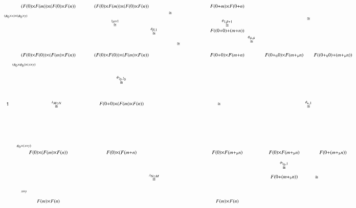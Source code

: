 \documentclass[reqno]{amsart}
\begin{document}
\[
\begin{tikzpicture}[scale=1.6]
\node () at (3,-2.5) {$\scriptstyle{\stackrel{\lambda_{M \odot N}}\cong}$};
\node () at (8,-2.5) {$\scriptstyle{\cong}$};
\node () at (5,-1.75) {$\scriptstyle{\stackrel{\phi_{!_0,!_0}}\cong}$};
\node () at (10.75,-2.5) {$\scriptstyle{\stackrel{\phi_{\kappa,1}}\cong}$};
\node () at (4.8,0) {$\scriptstyle{\stackrel{1 \mu \times 1}\cong}$};
\node () at (6.5,0.3) {$\scriptstyle{\cong}$};
\node () at (6,-0.25) {$\scriptstyle{\stackrel{\phi_{\beta,1}}\cong}$};
\node () at (8.25,0) {$\scriptstyle{\stackrel{\phi_{1,\beta+1}}\cong}$};
\node () at (6.75,-.65) {$\scriptstyle{\cong}$};
\node () at (9,-0.5) {$\scriptstyle{\stackrel{\phi_{\psi,\psi}}\cong}$};
\node () at (10.75,0.125) {$\scriptstyle{\cong}$};
\node (A) at (2.75,-1) {$\scriptstyle{(F(0) \times F(0)) \times (F(m) \times F(n))}$};
\node (A') at (5,-1) {$\scriptstyle{(F(0) \times F(0)) \times (F(m) \times F(n))}$};
\node (A'') at (8.25,-1) {$\scriptstyle{F(0+0) \times F(m+n)}$};
\node (A''') at (10,-1) {$\scriptstyle{F(0+_0 0) \times F(m+_b n)}$};
\node (A'''') at (11.5,-1) {$\scriptstyle{F((0+_0 0)+(m+_b n))}$};
\node (J) at (5,-2.5) {$\scriptstyle{F(0+0) \times (F(m) \times F(n))}$};
\node (J') at (6,-4.75) {$\scriptstyle{\stackrel{\lambda_{N \odot M}}\cong}$};
\node (J''') at (10,-4.375) {$\scriptstyle{\stackrel{\phi_{!_0,1}} \cong}$};
\node (J'''') at (11,-4.75) {$\scriptstyle{\cong}$};
\node (K) at (2.75,-4) {$\scriptstyle{F(0) \times (F(m) \times F(n))}$};
\node (K') at (5,-4) {$\scriptstyle{F(0) \times (F(m+n)}$};
\node (Y) at (10,-4.75) {$\scriptstyle{F(0+(m+_b n))}$};
\node (K'') at (8.25,-4) {$\scriptstyle{F(0) \times F(m+_b n)}$};
\node (K''') at (10,-4) {$\scriptstyle{F(0) \times F(m+_b n)}$};
\node (K'''') at (11.5,-4) {$\scriptstyle{F(0+(m+_b n))}$};
\node (D) at (1.5,-2.5) {$\scriptstyle{\one}$};
\node (E) at (8.25,0.5) {$\scriptstyle{F(0+m) \times F(0+n)}$};
\node (E') at (8.25,-0.25) {$\scriptstyle{F((0+0)+(m+n))}$};
\node (G) at (2.75,0.5) {$\scriptstyle{(F(0) \times F(m)) \times (F(0) \times F(n))}$};
\node (H) at (5,0.5) {$\scriptstyle{(F(0) \times F(m)) \times (F(0) \times F(n))}$};
\node (G'') at (2.75,-5.5) {$\scriptstyle{F(m) \times F(n)}$};
\node (B'') at (8.25,-5.5) {$\scriptstyle{F(m) \times F(n)}$};
\node (X) at (1.75,0.2) {$\scriptscriptstyle{(\phi_0 \times x) \times (\phi_0 \times y)}$};
\node (X') at (2,-1.3) {$\scriptscriptstyle{(\phi_0 \times \phi_0) \times (x \times y)}$};
\node (X') at (2,-3.8) {$\scriptscriptstyle{\phi_0 \times (x \times y)}$};
\node (X'') at (2,-5.2) {$\scriptscriptstyle{x \times y}$};

\end{tikzpicture}\]
\end{document}
